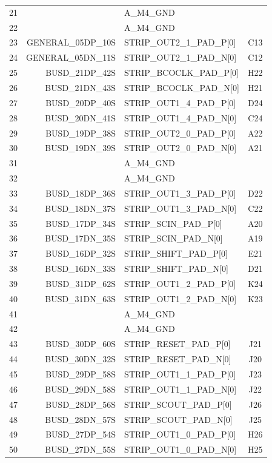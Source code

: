 \documentclass[11pt]{article}
\begin{document}
\begin{table}
\begin{center}
\begin{tabular}{|c|r|l|c|}
21 &                   & A\_M4\_GND &      \\
22 &                   & A\_M4\_GND &      \\ \hline
23 &GENERAL\_05DP\_10S & STRIP\_OUT2\_1\_PAD\_P[0]  &  C13 \\
24 &GENERAL\_05DN\_11S & STRIP\_OUT2\_1\_PAD\_N[0]  &  C12 \\ \hline
25 &   BUSD\_21DP\_42S & STRIP\_BCOCLK\_PAD\_P[0]   & H22 \\
26 &   BUSD\_21DN\_43S & STRIP\_BCOCLK\_PAD\_N[0]   & H21 \\ \hline
27 &   BUSD\_20DP\_40S & STRIP\_OUT1\_4\_PAD\_P[0]  &  D24 \\
28 &   BUSD\_20DN\_41S & STRIP\_OUT1\_4\_PAD\_N[0]  &  C24 \\ \hline
29 &   BUSD\_19DP\_38S & STRIP\_OUT2\_0\_PAD\_P[0]  &  A22 \\
30 &   BUSD\_19DN\_39S & STRIP\_OUT2\_0\_PAD\_N[0]  &  A21 \\ \hline
31 &                   & A\_M4\_GND & \\
32 &                   & A\_M4\_GND & \\ \hline
33 &   BUSD\_18DP\_36S & STRIP\_OUT1\_3\_PAD\_P[0]  &  D22 \\
34 &   BUSD\_18DN\_37S & STRIP\_OUT1\_3\_PAD\_N[0]  &  C22 \\ \hline
35 &   BUSD\_17DP\_34S & STRIP\_SCIN\_PAD\_P[0]     & A20 \\
36 &   BUSD\_17DN\_35S & STRIP\_SCIN\_PAD\_N[0]     & A19 \\ \hline
37 &   BUSD\_16DP\_32S & STRIP\_SHIFT\_PAD\_P[0]    & E21 \\
38 &   BUSD\_16DN\_33S & STRIP\_SHIFT\_PAD\_N[0]    & D21 \\ \hline
39 &   BUSD\_31DP\_62S & STRIP\_OUT1\_2\_PAD\_P[0]  &  K24 \\
40 &   BUSD\_31DN\_63S & STRIP\_OUT1\_2\_PAD\_N[0]  &  K23 \\ \hline
41 &                   & A\_M4\_GND & \\
42 &                   & A\_M4\_GND & \\ \hline
43 &   BUSD\_30DP\_60S & STRIP\_RESET\_PAD\_P[0]    & J21 \\
44 &   BUSD\_30DN\_32S & STRIP\_RESET\_PAD\_N[0]    & J20 \\ \hline
45 &   BUSD\_29DP\_58S & STRIP\_OUT1\_1\_PAD\_P[0]  &  J23 \\
46 &   BUSD\_29DN\_58S & STRIP\_OUT1\_1\_PAD\_N[0]  &  J22 \\ \hline
47 &   BUSD\_28DP\_56S & STRIP\_SCOUT\_PAD\_P[0]    & J26 \\
48 &   BUSD\_28DN\_57S & STRIP\_SCOUT\_PAD\_N[0]    & J25 \\ \hline
49 &   BUSD\_27DP\_54S & STRIP\_OUT1\_0\_PAD\_P[0]  &  H26 \\
50 &   BUSD\_27DN\_55S & STRIP\_OUT1\_0\_PAD\_N[0]  &  H25 \\ \hline
\end{tabular}
\end{center}
\end{table}
\end{document}
